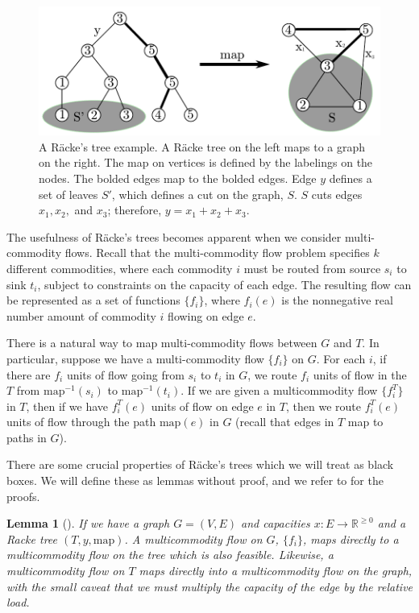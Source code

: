 \documentclass[12pt]{article}
\newtheorem{lemma}{Lemma}
\begin{document}
\begin{figure}
\label{fig:racketree}
\includegraphics[width=\linewidth]{RackeTree.pdf}
\caption{A R\"{a}cke's tree example. A R\"{a}cke tree on the left maps to a graph on the right. The map on vertices is defined by the labelings on the nodes. The bolded edges map to the bolded edges. Edge $y$ defines a set of leaves $S'$, which defines a cut on the graph, $S$. $S$ cuts edges $x_1, x_2,$ and $x_3$; therefore, $y = x_1 + x_2 + x_3$.}
\end{figure}

The usefulness of R\"{a}cke's trees becomes apparent when we consider multi-commodity flows. Recall that the multi-commodity flow problem specifies $k$ different commodities, where each commodity $i$ must be routed from source $s_i$ to sink $t_i$, subject to constraints on the capacity of each edge. The resulting flow can be represented as a set of functions $\{ f_i \}$, where $f_i(e)$ is the nonnegative real number amount of commodity $i$ flowing on edge $e$. 

There is a natural way to map multi-commodity flows between $G$ and $T$. In particular, suppose we have a multi-commodity flow $\{ f_i \}$ on $G$. For each $i$, if there are $f_i$ units of flow going from $s_i$ to $t_i$ in $G$, we route $f_i$ units of flow in the $T$ from $\mathrm{map}^{-1}(s_i)$ to $\mathrm{map}^{-1}(t_i)$. If we are given a multicommodity flow $\{ f_i^T \}$ in $T$, then if we have $f_i^T(e)$ units of flow on edge $e$ in $T$, then we route $f_i^T(e)$ units of flow through the path $\mathrm{map}(e)$ in $G$ (recall that edges in $T$ map to paths in $G$).

There are some crucial properties of R\"{a}cke's trees which we will treat as black boxes. We will define these as lemmas without proof, and we refer to \cite{racke} for the proofs.

\begin{lemma}[\cite{racke}]
\label{lem:mapflows}
If we have a graph $G = (V, E)$ and capacities $x: E \rightarrow \mathbb{R}^{\geq 0}$ and a Racke tree $(T, y, \text{map})$. A multicommodity flow on $G$, $\{ f_i \}$, maps directly to a multicommodity flow on the tree which is also feasible. Likewise, a multicommodity flow on $T$ maps directly into a multicommodity flow on the graph, with the small caveat that we must multiply the capacity of the edge by the relative load. 
\end{lemma}
\end{document}
